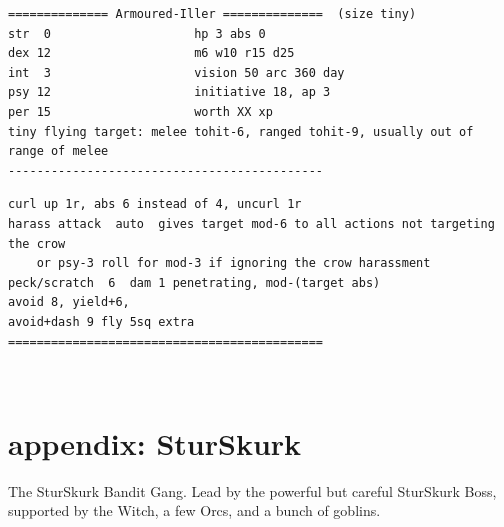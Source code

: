 \small \begin{samepage} \begin{verbatim}
============== Armoured-Iller ==============  (size tiny)
str  0                    hp 3 abs 0
dex 12                    m6 w10 r15 d25
int  3                    vision 50 arc 360 day
psy 12                    initiative 18, ap 3
per 15                    worth XX xp
tiny flying target: melee tohit-6, ranged tohit-9, usually out of range of melee
--------------------------------------------
\end{verbatim} \end{samepage} \goodbreak \begin{samepage} \begin{verbatim}
curl up 1r, abs 6 instead of 4, uncurl 1r
harass attack  auto  gives target mod-6 to all actions not targeting the crow
    or psy-3 roll for mod-3 if ignoring the crow harassment
peck/scratch  6  dam 1 penetrating, mod-(target abs)
avoid 8, yield+6, 
avoid+dash 9 fly 5sq extra
============================================
\end{verbatim} \end{samepage} \normalsize

\































\clearpage
\section*{appendix: SturSkurk}
\label{appendixsturskurk}

\raggedbottom

The SturSkurk Bandit Gang. Lead by the powerful but careful SturSkurk Boss, supported by the Witch, a few Orcs, and a bunch of goblins.

